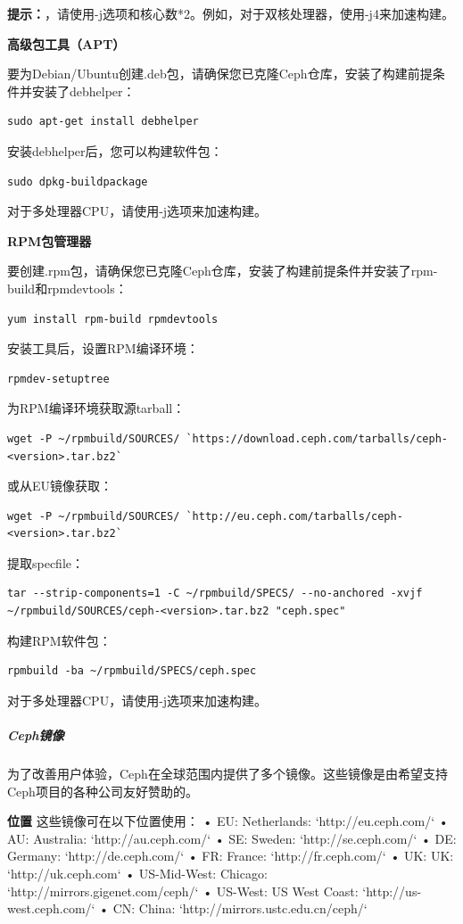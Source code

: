 \documentclass[12pt,UTF8]{ctexbook}
\begin{document}
\textbf{提示：}，请使用-j选项和核心数*2。例如，对于双核处理器，使用-j4来加速构建。

\textbf{高级包工具（APT）}

要为Debian/Ubuntu创建.deb包，请确保您已克隆Ceph仓库，安装了构建前提条件并安装了debhelper：
\begin{verbatim}
sudo apt-get install debhelper
\end{verbatim}

安装debhelper后，您可以构建软件包：
\begin{verbatim}
sudo dpkg-buildpackage
\end{verbatim}

对于多处理器CPU，请使用-j选项来加速构建。

\textbf{RPM包管理器}

要创建.rpm包，请确保您已克隆Ceph仓库，安装了构建前提条件并安装了rpm-build和rpmdevtools：
\begin{verbatim}
yum install rpm-build rpmdevtools
\end{verbatim}

安装工具后，设置RPM编译环境：
\begin{verbatim}
rpmdev-setuptree
\end{verbatim}

为RPM编译环境获取源tarball：
\begin{verbatim}
wget -P ~/rpmbuild/SOURCES/ `https://download.ceph.com/tarballs/ceph-<version>.tar.bz2`
\end{verbatim}

或从EU镜像获取：
\begin{verbatim}
wget -P ~/rpmbuild/SOURCES/ `http://eu.ceph.com/tarballs/ceph-<version>.tar.bz2`
\end{verbatim}

提取specfile：
\begin{verbatim}
tar --strip-components=1 -C ~/rpmbuild/SPECS/ --no-anchored -xvjf ~/rpmbuild/SOURCES/ceph-<version>.tar.bz2 "ceph.spec"
\end{verbatim}

构建RPM软件包：
\begin{verbatim}
rpmbuild -ba ~/rpmbuild/SPECS/ceph.spec
\end{verbatim}

对于多处理器CPU，请使用-j选项来加速构建。

\subparagraph{Ceph镜像}
为了改善用户体验，Ceph在全球范围内提供了多个镜像。这些镜像是由希望支持Ceph项目的各种公司友好赞助的。

\textbf{位置}
这些镜像可在以下位置使用：
• EU: Netherlands: `http://eu.ceph.com/`
• AU: Australia: `http://au.ceph.com/`
• SE: Sweden: `http://se.ceph.com/`
• DE: Germany: `http://de.ceph.com/`
• FR: France: `http://fr.ceph.com/`
• UK: UK: `http://uk.ceph.com`
• US-Mid-West: Chicago: `http://mirrors.gigenet.com/ceph/`
• US-West: US West Coast: `http://us-west.ceph.com/`
• CN: China: `http://mirrors.ustc.edu.cn/ceph/`
\end{document}
